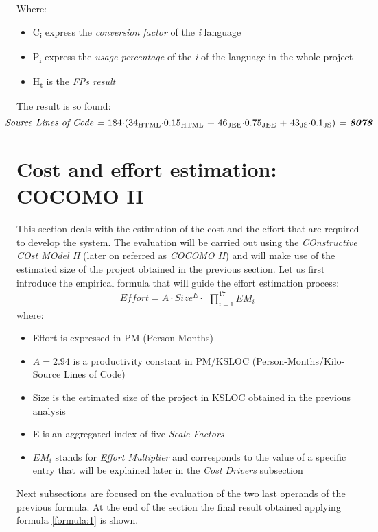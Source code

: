 \documentclass[11pt,a4paper]{report}
\begin{document}
Where:
\begin{itemize}
	\item C\textsubscript{i} express the \textit{conversion factor} of the \textit{i} language
	\item P\textsubscript{i}
	express the \textit{usage percentage} of the \textit{i} of the language in the whole project
	\item H\textsubscript{t} is the \textit{FPs result}
\end{itemize}
The result is so found:
\begin{equation}
\centerline{\textit{Source Lines of Code =} $184\cdot$($34\textsubscript{HTML}\cdot$0.15\textsubscript{HTML} + $46\textsubscript{JEE}\cdot$0.75\textsubscript{JEE} + $43\textsubscript{JS}\cdot$0.1\textsubscript{JS}) \textit{= \textbf{8078}}}
\end{equation}
\newpage
\section{Cost and effort estimation: COCOMO II}
This section deals with the estimation of the cost and the effort that are required to develop the system. The evaluation will be carried out using the \textit{COnstructive COst MOdel II} (later on referred as \textit{COCOMO II}) and will make use of the estimated size of the project obtained in the previous section. Let us first introduce the empirical formula that will guide the effort estimation process:
\begin{equation} \label{formula:1}
Effort = A \cdot Size^E \cdot \begin{matrix} \prod_{i=1}^{17} EM_i \end{matrix}
\end{equation}
\noindent where:
\begin{itemize}
	\item Effort is expressed in PM (Person-Months)
	\item $A = 2.94$ is a productivity constant in PM/KSLOC (Person-Months/Kilo-Source Lines of Code)
	\item Size is the estimated size of the project in KSLOC obtained in the previous analysis
	\item E is an aggregated index of five \textit{Scale Factors}
	\item $EM_{i}$ stands for \textit{Effort Multiplier} and corresponds to the value of a specific entry that will be explained later in the \textit{Cost Drivers} subsection
\end{itemize}
Next subsections are focused on the evaluation of the two last operands of the previous formula. At the end of the section the final result obtained applying formula \ref{formula:1} is shown.
\end{document}
